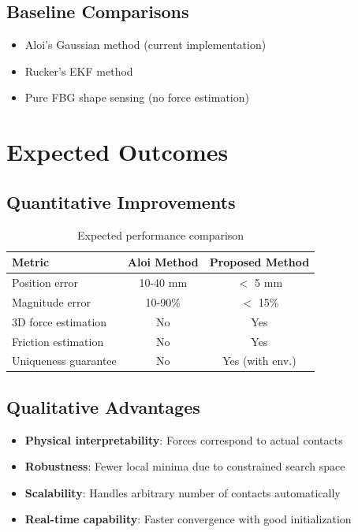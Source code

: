 \documentclass[11pt]{article}
\begin{document}
\subsection{Baseline Comparisons}

\begin{itemize}
    \item Aloi's Gaussian method (current implementation)
    \item Rucker's EKF method
    \item Pure FBG shape sensing (no force estimation)
\end{itemize}

\section{Expected Outcomes}

\subsection{Quantitative Improvements}

\begin{table}[h]
\centering
\begin{tabular}{@{}lcc@{}}
\toprule
\textbf{Metric} & \textbf{Aloi Method} & \textbf{Proposed Method} \\ \midrule
Position error & 10-40 mm & $<$ 5 mm \\
Magnitude error & 10-90\% & $<$ 15\% \\
3D force estimation & No & Yes \\
Friction estimation & No & Yes \\
Uniqueness guarantee & No & Yes (with env.) \\ \bottomrule
\end{tabular}
\caption{Expected performance comparison}
\end{table}

\subsection{Qualitative Advantages}

\begin{itemize}
    \item \textbf{Physical interpretability}: Forces correspond to actual contacts
    \item \textbf{Robustness}: Fewer local minima due to constrained search space
    \item \textbf{Scalability}: Handles arbitrary number of contacts automatically
    \item \textbf{Real-time capability}: Faster convergence with good initialization
\end{itemize}
\end{document}

